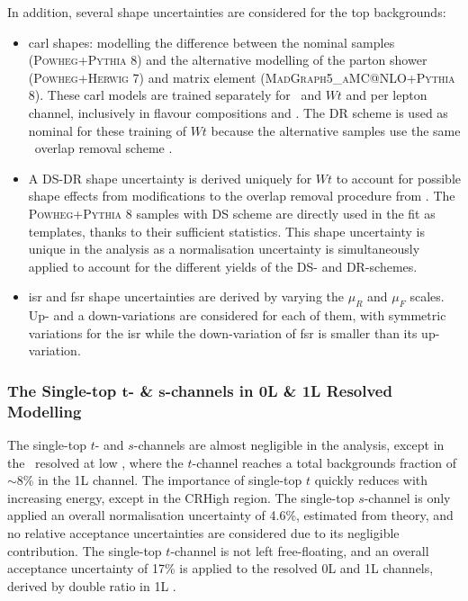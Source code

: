 In addition, several shape uncertainties are considered for the top backgrounds: 
\begin{itemize}[leftmargin=*]
    \item \gls{carl} shapes: modelling the difference between the nominal samples (\textsc{Powheg}+\textsc{Pythia} 8) and the alternative modelling of the parton shower (\textsc{Powheg}+\textsc{Herwig} 7) and matrix element (\textsc{MadGraph5\_aMC@NLO}+\textsc{Pythia} 8). These \gls{carl} models are trained separately for \ttb\ and $Wt$ and per lepton channel, inclusively in flavour compositions and \nj. The DR scheme is used as nominal for these training of $Wt$ because the alternative samples use the same \ttb\ overlap removal scheme \cite{StefanoFrixione_2008}. 
    \item A DS-DR shape uncertainty is derived uniquely for $Wt$ to account for possible shape effects from modifications to the overlap removal procedure from \ttb. The \textsc{Powheg}+\textsc{Pythia} 8 samples with DS scheme are directly used in the fit as templates, thanks to their sufficient statistics. This shape uncertainty is unique in the analysis as a normalisation uncertainty is simultaneously applied to account for the different yields of the DS- and DR-schemes.
    \item \gls{isr} and \gls{fsr} shape uncertainties are derived by varying the $\mu_R$ and $\mu_F$ scales. Up- and a down-variations are considered for each of them, with symmetric variations for the \gls{isr} while the down-variation of \gls{fsr} is smaller than its up-variation.
\end{itemize} 

\subsubsection{The Single-top $\boldsymbol{t}$- \& $\boldsymbol{s}$-channels in 0L \& 1L Resolved Modelling}
The single-top $t$- and $s$-channels are almost negligible in the analysis, except in the \vhb\ resolved at low \ptv, where the $t$-channel reaches a total backgrounds fraction of $\sim$8\% in the 1L channel. The importance of single-top $t$ quickly reduces with increasing energy, except in the CRHigh region. The single-top $s$-channel is only applied an overall normalisation uncertainty of 4.6\%, estimated from theory, and no relative acceptance uncertainties are considered due to its negligible contribution. The single-top $t$-channel is not left free-floating, and an overall acceptance uncertainty of 17\% is applied to the resolved 0L and 1L channels, derived by double ratio in 1L \vhb. \\

